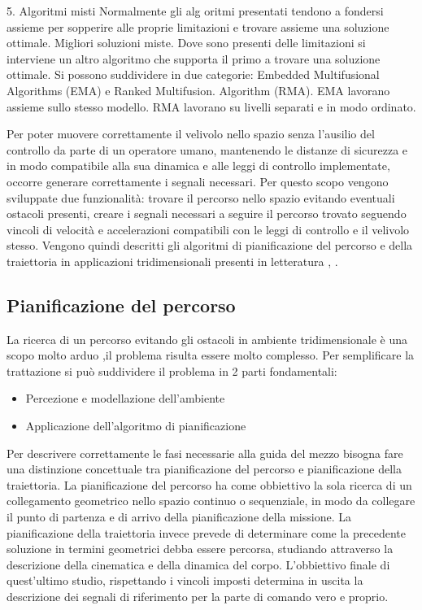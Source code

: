 \begin{idee}
	5. Algoritmi misti
		Normalmente gli alg
		oritmi presentati tendono a fondersi assieme per sopperire alle proprie limitazioni e trovare assieme una soluzione ottimale. Migliori soluzioni miste. Dove sono presenti delle limitazioni si interviene un altro algoritmo che supporta il primo a trovare una soluzione ottimale.	Si possono suddividere in due categorie: Embedded Multifusional Algorithms (EMA) e Ranked Multifusion. Algorithm (RMA).
		EMA lavorano assieme sullo stesso modello.
		RMA lavorano su livelli separati e in modo ordinato.	
	
\end{idee}

Per poter muovere correttamente il velivolo nello spazio senza l'ausilio del controllo da parte di un operatore umano, mantenendo le distanze di sicurezza e in modo compatibile alla sua dinamica e alle leggi di controllo implementate, occorre generare correttamente i segnali necessari. Per questo scopo vengono sviluppate due funzionalità: trovare il percorso nello spazio evitando eventuali ostacoli presenti, creare i segnali necessari a seguire il percorso trovato seguendo vincoli di velocità e accelerazioni compatibili con le leggi di controllo e il velivolo stesso. Vengono quindi descritti gli algoritmi di pianificazione del percorso e della traiettoria in applicazioni tridimensionali presenti in letteratura \cite{YangLiang2016SoR3}, \cite{PathPlannigOverview}.

\subsection{Pianificazione del percorso}

La ricerca di un percorso evitando gli ostacoli in ambiente tridimensionale è una scopo molto arduo ,il problema risulta essere molto complesso. Per semplificare la trattazione si può suddividere il problema in 2 parti fondamentali:
\begin{itemize}
	\item Percezione e modellazione dell'ambiente
	\item Applicazione dell'algoritmo di pianificazione
\end{itemize}


Per descrivere correttamente le fasi necessarie alla guida del mezzo bisogna fare una distinzione concettuale tra pianificazione del percorso e pianificazione della traiettoria. La pianificazione del percorso ha come obbiettivo la sola ricerca di un collegamento geometrico nello spazio continuo o sequenziale, in modo da collegare il punto di partenza e di arrivo della pianificazione della missione. La pianificazione della traiettoria invece prevede di determinare come la precedente soluzione in termini geometrici debba essere percorsa, studiando attraverso la descrizione della cinematica e della dinamica del corpo. L'obbiettivo finale di quest'ultimo studio, rispettando i vincoli imposti determina in uscita la descrizione dei segnali di riferimento per la parte di comando vero e proprio.

